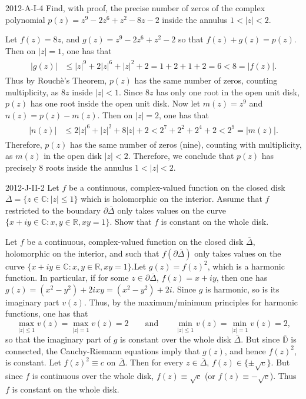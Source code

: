 \documentclass{article}
\begin{document}
	\begin{prb}{2012-A-I-4}
		Find, with proof, the precise number of zeros of the complex polynomial $p(z) = z^{9} - 2z^{6} + z^{2} - 8z - 2$ inside the annulus $1 < |z| < 2$. 
	\end{prb}
	Let $f(z) = 8z$, and $g(z) = z^{9} - 2z^{6} + z^{2} - 2$ so that $f(z) + g(z) =p(z)$. Then on $|z| = 1$, one has that 
	\begin{align*}
		\begin{split}
			|g(z)| &\leq |z|^{9} + 2|z|^{6} + |z|^{2} + 2 = 1 + 2 + 1 + 2 = 6 
			< 8 = |f(z)|. 
		\end{split}
	\end{align*}
	Thus by Rouch\`e's Theorem, $p(z)$ has the same number of zeros, counting multiplicity, as $8z$ inside $|z| < 1$. Since $8z$ has only one root in the open unit disk, $p(z)$ has one root inside the open unit disk. Now let $m(z) = z^{9}$ and $n(z) = p(z) - m(z)$. Then on $|z| = 2$, one has that 
	\begin{align*}
		\begin{split}
			|n(z)| &\leq 2|z|^{6} + |z|^{2} + 8|z| + 2 < 2^{7} + 2^{2} + 2^{4} + 2 < 2^{9} = |m(z)|. 
		\end{split}
	\end{align*}
	Therefore, $p(z)$ has the same number of zeros (nine), counting with multiplicity, as $m(z)$ in the open disk $|z| < 2$. Therefore, we conclude that $p(z)$ has precisely 8 roots inside the annulus $1 < |z| < 2$. 
	
	\begin{prb}{2012-J-II-2}
		Let $f$ be a continuous, complex-valued function on the closed disk $\overline{\Delta} =\{z \in \mathbb{C}: |z| \leq 1\}$ which is holomorphic on the interior. Assume  that $f$ restricted to the boundary $\partial \overline{\Delta}$ only takes values on the curve $\{x + iy \in \mathbb{C}: x, y \in \mathbb{R}, xy = 1\}$. Show that $f$ is constant on the whole disk. 
	\end{prb}
	Let $f$ be a continuous, complex-valued function on the closed disk $\overline{\Delta}$, holomorphic on the interior, and such that $f(\partial \overline{\Delta})$ only takes values on the curve $\{x + iy \in \mathbb{C}: x,y \in \mathbb{R}, xy = 1\}$.Let $g(z) = f(z)^{2}$, which is a harmonic function. In particular, if for some $z \in \partial \overline{\Delta}$, $f(z)= x + iy$, then one has $g(z) = (x^{2} - y^{2}) + 2ixy = (x^{2} - y^{2}) + 2i$. Since $g$ is harmonic, so is its imaginary part $v(z)$. Thus, by the maximum/minimum principles for harmonic functions, one has that 
	\begin{equation*}
		\max_{|z| \leq 1}v(z) = \max_{|z| = 1}v(z) = 2 \qquad \text{and} \qquad \min_{|z| \leq 1}v(z) = \min_{|z| = 1}v(z) = 2, 
	\end{equation*}
	so that the imaginary part of $g$ is constant over the whole disk $\overline{\Delta}$. But since $\overline{\mathbb{D}}$ is connected, the Cauchy-Riemann equations imply that $g(z)$, and hence $f(z)^{2}$, is constant. Let $f(z)^{2}\equiv c$ on $\overline{\Delta}$. Then for every $z \in \overline{\Delta}$, $f(z) \in \{\pm \sqrt{c}\}$. But since $f$ is continuous over the whole disk, $f(z) \equiv \sqrt{c}$ (or $f(z) \equiv -\sqrt{c}$). Thus $f$ is constant on the whole disk. 
	
\end{document}
